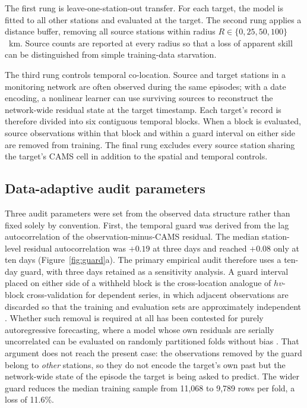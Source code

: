 The first rung is leave-one-station-out transfer. For each target, the model is fitted to all other stations and evaluated at the target. The second rung applies a distance buffer, removing all source stations within radius $R\in\{0,25,50,100\}$~km. Source counts are reported at every radius so that a loss of apparent skill can be distinguished from simple training-data starvation.

The third rung controls temporal co-location. Source and target stations in a monitoring network are often observed during the same episodes; with a date encoding, a nonlinear learner can use surviving sources to reconstruct the network-wide residual state at the target timestamp. Each target's record is therefore divided into six contiguous temporal blocks. When a block is evaluated, source observations within that block and within a guard interval on either side are removed from training. The final rung excludes every source station sharing the target's CAMS cell in addition to the spatial and temporal controls.

\subsection{Data-adaptive audit parameters}

Three audit parameters were set from the observed data structure rather than fixed solely by convention. First, the temporal guard was derived from the lag autocorrelation of the observation-minus-CAMS residual. The median station-level residual autocorrelation was $+0.19$ at three days and reached $+0.08$ only at ten days (Figure~\ref{fig:guard}a). The primary empirical audit therefore uses a ten-day guard, with three days retained as a sensitivity analysis. A guard interval placed on either side of a withheld block is the cross-location analogue of $hv$-block cross-validation for dependent series, in which adjacent observations are discarded so that the training and evaluation sets are approximately independent \citep{racine2000}. Whether such removal is required at all has been contested for purely autoregressive forecasting, where a model whose own residuals are serially uncorrelated can be evaluated on randomly partitioned folds without bias \citep{bergmeir2012,cerqueira2020}. That argument does not reach the present case: the observations removed by the guard belong to \emph{other} stations, so they do not encode the target's own past but the network-wide state of the episode the target is being asked to predict. The wider guard reduces the median training sample from 11,068 to 9,789 rows per fold, a loss of 11.6\%.

